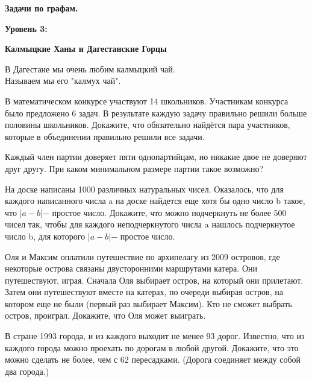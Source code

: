\hspace{3mm}

\centerline{\bf \Huge  Задачи по графам.}
\centerline{\bf \Huge Уровень 3:}
\centerline{\bf \Huge Калмыцкие Ханы и Дагестанские Горцы}

\begin{flushright}
    \scriptsize{В Дагестане мы очень любим калмыцкий чай.\\
                Называем мы его "калмух чай".}
\end{flushright}

В математическом конкурсе участвуют 14 школьников. Участникам конкурса было предложено 6 задач. В результате каждую задачу правильно решили больше половины школьников. Докажите, что обязательно найдётся пара участников, которые в объединении правильно решили все задачи.

Каждый член партии доверяет пяти однопартийцам, но никакие двое не доверяют друг другу. При каком минимальном размере партии такое возможно?

На доске написаны 1000 различных натуральных чисел. Оказалось, что для каждого написанного числа a на доске найдется еще хотя бы одно число b такое, что |$a - b| - $ простое число. Докажите, что можно подчеркнуть не более 500 чисел так, чтобы для каждого неподчеркнутого числа a нашлось подчеркнутое число b, для которого |$a - b| -$ простое число.

Оля и Максим оплатили путешествие по архипелагу из 2009 островов, где некоторые острова связаны двусторонними маршрутами катера. Они путешествуют, играя. Сначала Оля выбирает остров, на который они прилетают. Затем они путешествуют вместе на катерах, по очереди выбирая остров, на котором еще не были (первый раз выбирает Максим). Кто не сможет выбрать остров, проиграл. Докажите, что Оля может выиграть.

В стране 1993 города, и из каждого выходит не менее 93 дорог. Известно, что из каждого города можно проехать по дорогам в любой другой. Докажите, что это можно сделать не более, чем с 62 пересадками. (Дорога соединяет между собой два города.)